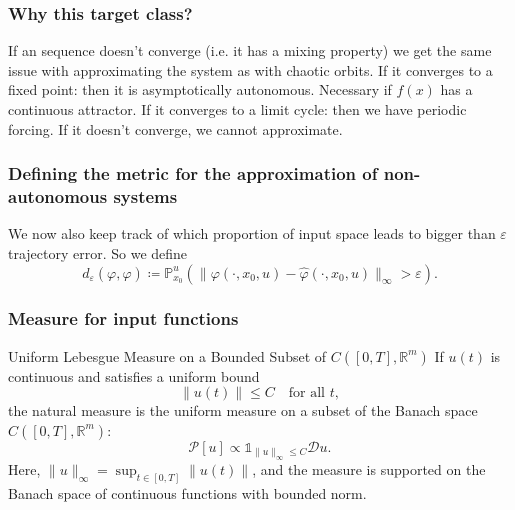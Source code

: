 \documentclass{article}
\newcommand{\reals}{\mathbb{R}}
\newcounter{ct}
\begin{document}
\subsubsection{Why this target class?}
If an sequence doesn't converge (i.e. it has a mixing property) we get the same issue with approximating the system as with chaotic orbits.
If it converges to a fixed point: then it is asymptotically autonomous. Necessary if $f(x)$ has a continuous attractor.
If it converges to a limit cycle: then we have periodic forcing. 
If it doesn't converge, we cannot approximate.  



\subsubsection{Defining the metric for the approximation of non-autonomous systems}\label{sec:inputdriven_metric}
We now also keep track of which proportion of input space leads to bigger than $\varepsilon$ trajectory error.
So we define 
\begin{equation}%
d_\varepsilon(\varphi,\hat \varphi) \coloneqq  \mathbb{P}_{x_0}^{u}\left(\|\varphi(\cdot,x_0,u)-\hat \varphi(\cdot,x_0,u)\|_\infty>\varepsilon\right).
\end{equation}


\subsubsection{Measure for input functions}%
Uniform Lebesgue Measure on a Bounded Subset of \( C([0,T], \reals^m) \)
If \( u(t) \) is continuous and satisfies a uniform bound
\[
\|u(t)\| \leq C \quad \text{for all } t,
\]
the natural measure is the uniform measure on a subset of the Banach space \( C([0,T], \reals^m) \):
\[
\mathcal{P}[u] \propto \mathds{1}_{\|u\|_\infty \leq C} \mathcal{D} u.
\]
Here, \( \|u\|_\infty = \sup_{t \in [0,T]} \|u(t)\| \), and the measure is supported on the Banach space of continuous functions with bounded norm.
\end{document}
